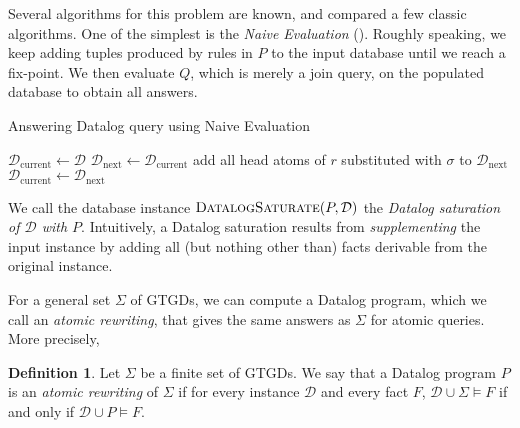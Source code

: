 \documentclass[12pt]{report}
\theoremstyle{plain}
\theoremstyle{definition}
\newtheorem{definition}[theorem]{Definition}
\begin{document}
Several algorithms for this problem are known, and \cite{bancilhon_ramakrishnan_1986} compared a few classic algorithms. One of the simplest is the \emph{Naive Evaluation} (). Roughly speaking, we keep adding tuples produced by rules in $P$ to the input database until we reach a fix-point. We then evaluate $Q$, which is merely a join query, on the populated database to obtain all answers.

\begin{algorithm}
\caption{Answering Datalog query using Naive Evaluation}
\label{naive-evaluation-algorithm}
\begin{algorithmic}[1]
  \State $\mathcal{D}_\mathrm{current} \gets \mathcal{D}$
    \State $\mathcal{D}_\mathrm{next} \gets \mathcal{D}_\mathrm{current}$
        \State add all head atoms of $r$ substituted with $\sigma$ to $\mathcal{D}_\mathrm{next}$
      \EndFor
    \EndFor
    \State
      \State $\mathcal{D}_\mathrm{current} \gets \mathcal{D}_\mathrm{next}$
    \Else
      \State {}
    \EndIf
  \EndWhile
\EndProcedure
\State
{}
  \State {}
\EndProcedure
\end{algorithmic}
\end{algorithm}

We call the database instance $\textsc{DatalogSaturate}(P, \mathcal{D})$ the \emph{Datalog saturation of $\mathcal{D}$ with $P$}. Intuitively, a Datalog saturation results from \emph{supplementing} the input instance by adding all (but nothing other than) facts derivable from the original instance.

For a general set $\Sigma$ of GTGDs, we can compute a Datalog program, which we call an \emph{atomic rewriting}, that gives the same answers as $\Sigma$ for atomic queries. More precisely,

\begin{definition}
  Let $\Sigma$ be a finite set of GTGDs. We say that a Datalog program $P$ is an \emph{atomic rewriting} of $\Sigma$ if for every instance $\mathcal{D}$ and every fact $F$, $\mathcal{D} \cup \Sigma \models F$ if and only if $\mathcal{D} \cup P \models F$.
\end{definition}
\end{document}
